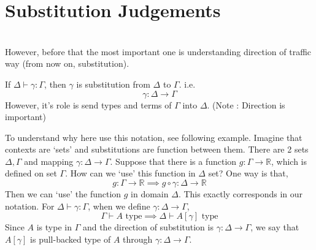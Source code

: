 \documentclass[12pt, a4paper, openany, twoside]{book}
\theoremstyle{definition}
\theoremstyle{remark}
\theoremstyle{plain}
\numberwithin{equation}{section}
\begin{document}
\section{Substitution Judgements}\label{subst judgement} \quad \\

However, before that the most 
important one is understanding direction of traffic way (from now on, substitution). 

\begin{tcolorbox}[colback=yellow!10!white,colframe=blue!75!black,title=Definition 1.3.1.]\label{1.3.1}
    If $\Delta \vdash \gamma : \Gamma$, then $\gamma$ is substitution from $\Delta$ to $\Gamma$. i.e. 
    \[\gamma : \Delta \rightarrow \Gamma\]
    However, it's role is send types and terms of $\Gamma$ into $\Delta$. (Note : Direction is important)
\end{tcolorbox}

\begin{tcolorbox}[colback=yellow!10!white,colframe=red!75!black,title=1.3.  Intuitions for direction of substitutions]\label{intuition}
    To understand why here use this notation, see following example. Imagine that contexts are \lq sets' 
    and substitutions are function between them. There are 2 sets $\Delta, \Gamma$ and mapping $\gamma : \Delta \rightarrow \Gamma$. 
    Suppose that there is a function $g : \Gamma \rightarrow \mathbb{R}$, which is defined on set $\Gamma$. How can we 
    \lq use' this function in $\Delta$ set? One way is that, 
    \[g : \Gamma \rightarrow \mathbb{R} \implies g \circ \gamma : \Delta \rightarrow \mathbb{R}\]
    Then we can \lq use' the function $g$ in domain $\Delta$. This exactly corresponds in our notation. 
    For $\Delta \vdash \gamma : \Gamma$, when we define $\gamma : \Delta \rightarrow \Gamma$, 
    \[\Gamma \vdash A \text{ type} \implies \Delta \vdash A[\gamma] \text{ type}\]
    Since $A$ is type in $\Gamma$ and the direction of substitution is $\gamma : \Delta \rightarrow \Gamma$, we say that 
    $A[\gamma]$ is pull-backed type of $A$ through $\gamma : \Delta \rightarrow \Gamma$. 
\end{tcolorbox}
\end{document}
